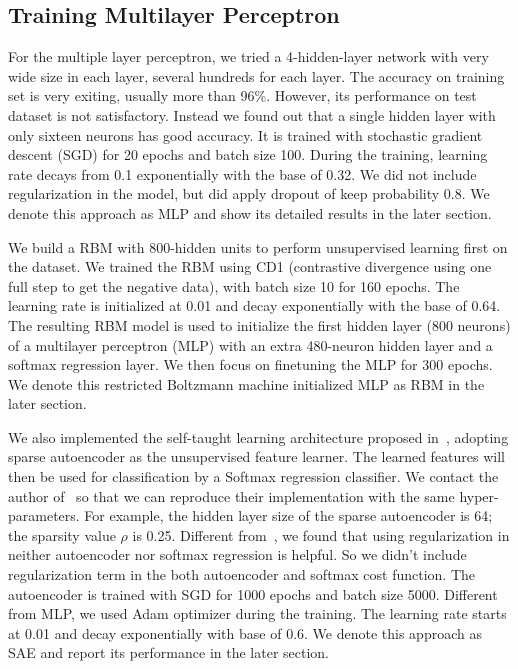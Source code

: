 \subsection{Training Multilayer Perceptron}
For the multiple layer perceptron, we tried a 4-hidden-layer network with
very wide size in each layer, several hundreds for each layer.
The accuracy on training set is very exiting, usually more than 96\%.
However, its performance on test dataset is not satisfactory.
Instead we found out that a single hidden layer with only sixteen neurons has good accuracy.
It is trained with stochastic gradient descent (SGD) for 20 epochs and batch size 100.
During the training, learning rate decays from 0.1 exponentially with the base of 0.32.
We did not include regularization in the model, but did apply dropout of keep probability 0.8.
We denote this approach as MLP and show its detailed results in the later section.

We build a RBM with 800-hidden units to perform unsupervised learning first on the dataset.
We trained the RBM using CD1 (contrastive divergence using one full step to get the negative data),
with batch size 10 for 160 epochs.
The learning rate is initialized at 0.01 and decay exponentially with the base of 0.64.
The resulting RBM model is used to initialize the first hidden layer (800 neurons) of a multilayer perceptron (MLP)
with an extra 480-neuron hidden layer and a softmax regression layer.
We then focus on finetuning the MLP for 300 epochs.
We denote this restricted Boltzmann machine initialized MLP as RBM in the later section.

We also implemented the self-taught learning architecture proposed in~\cite{STL-NIDS, SparseAE},
adopting sparse autoencoder as the unsupervised feature learner.
The learned features will then be used for classification by a Softmax regression classifier.
We contact the author of~\cite{STL-NIDS} so that we can reproduce their implementation
with the same hyper-parameters.
For example, the hidden layer size of the sparse autoencoder is 64;
the sparsity value $\rho$ is 0.25.
Different from~\cite{STL-NIDS}, we found that using regularization in
neither autoencoder nor softmax regression is helpful.
So we didn't include regularization term in the both autoencoder and softmax cost function.
The autoencoder is trained with SGD for 1000 epochs and batch size 5000.
Different from MLP, we used Adam optimizer during the training.
The learning rate starts at 0.01 and decay exponentially with base of 0.6.
We denote this approach as SAE and report its performance in the later section.


